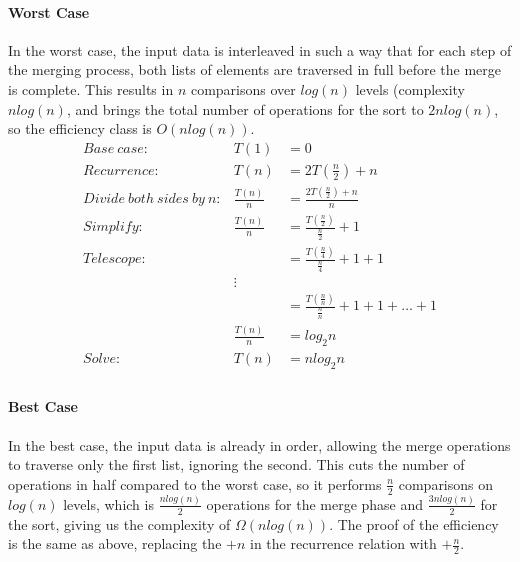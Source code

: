 \documentclass{article}
\begin{document}
        \paragraph{Worst Case}
          In the worst case, the input data is interleaved in such a way that
          for each step of the merging process, both lists of elements are
          traversed in full before the merge is complete.  This results in $n$
          comparisons over $log(n)$ levels (complexity $n log(n)$, and brings
          the total number of operations for the sort to $2n log(n)$, so the
          efficiency class is $O(n log(n))$.
          $$\begin{array}{rrl} Base\ case: & T(1) & = 0 \\

          Recurrence: & T(n) & = 2 T(\frac{n}{2}) + n \\

          Divide\ both\ sides\ by\ n: & \frac{T(n)}{n} & = \frac{2
              T(\frac{n}{2}) + n}{n} \\

          Simplify: & \frac{T(n)}{n} & = \frac{T(\frac{n}{2})}{\frac{n}{2}} + 1 \\

          Telescope: & & = \frac{T(\frac{n}{4})}{\frac{n}{4}} + 1 + 1 \\

          & \vdots & \\

          & & = \frac{T(\frac{n}{n})}{\frac{n}{n}} + 1 + 1 + \dots + 1 \\
          
          & \frac{T(n)}{n} & = log_2 n \\

          Solve: & T(n) & = n log_2 n \\
          \end{array}$$

        \paragraph{Best Case}
          In the best case, the input data is already in order, allowing the
          merge operations to traverse only the first list, ignoring the second.
          This cuts the number of operations in half compared to the worst
          case, so it performs $\frac{n}{2}$ comparisons on $log(n)$ levels,
          which is $\frac{n log(n)}{2}$ operations for the merge phase and
          $\frac{3n log(n)}{2}$ for the sort, giving us the complexity of
          $\Omega(n log(n))$.  The proof of the efficiency is the same as
          above, replacing the $ + n$ in the recurrence relation with $ +
          \frac{n}{2}$.
\end{document}

